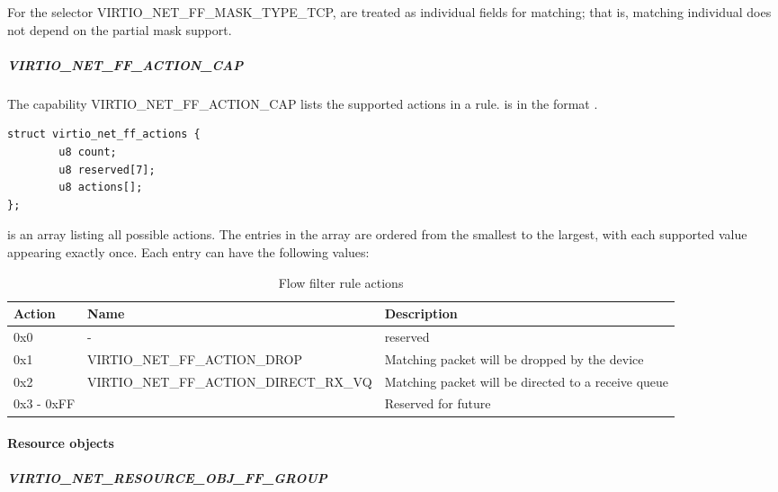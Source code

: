 For the selector  VIRTIO_NET_FF_MASK_TYPE_TCP, 
are treated as individual fields for matching; that is, matching individual
 does not depend on the partial mask support.

\subparagraph{VIRTIO_NET_FF_ACTION_CAP}
\label{par:Device Types / Network Device / Device Operation / Flow filter / Device and driver capabilities / VIRTIO-NET-FF-ACTION-CAP}

The capability VIRTIO_NET_FF_ACTION_CAP lists the supported actions in a rule.
 is in the format .

\begin{lstlisting}
struct virtio_net_ff_actions {
        u8 count;
        u8 reserved[7];
        u8 actions[];
};
\end{lstlisting}

 is an array listing all possible actions.
The entries in the array are ordered from the smallest to the largest,
with each supported value appearing exactly once. Each entry can have the
following values:

\begin{table}[H]
\caption{Flow filter rule actions}
\label{table:Device Types / Network Device / Device Operation / Flow filter / Device and driver capabilities / VIRTIO-NET-FF-ACTION-CAP / flow filter rule actions}
\begin{tabularx}{\textwidth}{ |l|X|X| }
\hline
Action & Name & Description \\
\hline \hline
0x0 & - & reserved \\
\hline
0x1 & VIRTIO_NET_FF_ACTION_DROP & Matching packet will be dropped by the device \\
\hline
0x2 & VIRTIO_NET_FF_ACTION_DIRECT_RX_VQ & Matching packet will be directed to a receive queue \\
\hline
0x3 - 0xFF & & Reserved for future \\
\hline
\end{tabularx}
\end{table}

\paragraph{Resource objects}
\label{par:Device Types / Network Device / Device Operation / Flow filter / Resource objects}

\subparagraph{VIRTIO_NET_RESOURCE_OBJ_FF_GROUP}\label{par:Device Types / Network Device / Device Operation / Flow filter / Resource objects / VIRTIO-NET-RESOURCE-OBJ-FF-GROUP}

